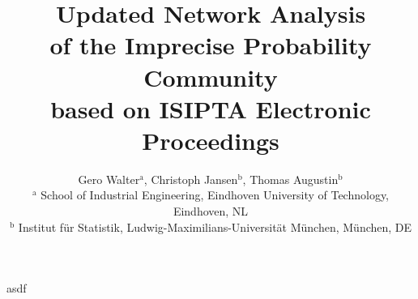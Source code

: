\documentclass[a0,red]{opacpstr}
\title{\huge Updated Network Analysis\\ of the Imprecise Probability Community\\ based on ISIPTA Electronic Proceedings}
\author{{ Gero Walter${}^\text{a}$, Christoph Jansen${}^\text{b}$, Thomas Augustin${}^\text{b}$}\\
        {\small ${}^\text{a}$ School of Industrial Engineering, Eindhoven University of Technology, Eindhoven, NL\\[-1ex]
                ${}^\text{b}$ Institut für Statistik, Ludwig-Maximilians-Universität München, München, DE}}
\begin{document}
asdf
\end{document}
